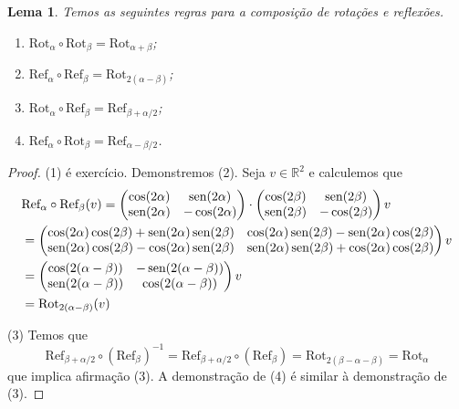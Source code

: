 \documentclass[12pt]{amsart}
\newcommand{\R}{\mathbb R}
\DeclareMathOperator{\sen}{\textrm{\rm sen}}
\newcommand{\rot}[1]{{\textrm{Rot}}_{#1}}
\newcommand{\refl}[1]{{\textrm{Ref}}_{#1}}
\newtheorem{lemma}[theorem]{Lema}
\theoremstyle{definition}
\begin{document}
\begin{lemma}
    Temos as seguintes regras para a composição de rotações e reflexões.
    \begin{enumerate}
        \item $\rot{\alpha}\circ\rot{\beta}=\rot{\alpha+\beta}$;
        \item $\refl{\alpha}\circ\refl{\beta}=\rot{2(\alpha-\beta)}$;
        \item $\rot{\alpha}\circ\refl{\beta}=\refl{\beta+\alpha/2}$;
        \item $\refl{\alpha}\circ\rot{\beta}=\refl{\alpha-\beta/2}$.
    \end{enumerate}
\end{lemma}
\begin{proof}
    (1) é exercício. Demonstremos (2). Seja $v\in\R^2$ e calculemos que 
    \begin{align*}
        &\refl{\alpha}\circ\refl{\beta}(v)=\begin{pmatrix}\cos(2\alpha) & \sen (2\alpha)\\\sen (2\alpha) &-\cos (2\alpha)\end{pmatrix}\cdot \begin{pmatrix}\cos (2\beta) & \sen (2\beta)\\\sen(2\beta) &-\cos(2\beta)\end{pmatrix}v\\
        &=\begin{pmatrix}
            \cos(2\alpha)\cos(2\beta)+\sen(2\alpha)\sen(2\beta) & \cos(2\alpha)\sen(2\beta)-\sen(2\alpha)\cos(2\beta)\\
            \sen(2\alpha)\cos(2\beta)-\cos(2\alpha)\sen(2\beta) & 
            \sen(2\alpha)\sen(2\beta)+\cos(2\alpha)\cos(2\beta)
        \end{pmatrix}v\\
        &=\begin{pmatrix} \cos(2(\alpha-\beta)) &  -\sen(2(\alpha-\beta))\\
            \sen(2(\alpha-\beta)) & \cos(2(\alpha-\beta)) 
        \end{pmatrix} v \\
        &=\rot{2(\alpha-\beta)}(v)
    \end{align*}
    
    (3) Temos que 
    \[
        \refl{\beta+\alpha/2}\circ(\refl{\beta})^{-1}=\refl{\beta+\alpha/2}\circ(\refl{\beta})=\rot{2(\beta-\alpha-\beta)}=\rot{\alpha}
    \]
    que implica afirmação (3). A demonstração de (4) é similar à demonstração de (3).
\end{proof}
\end{document}
